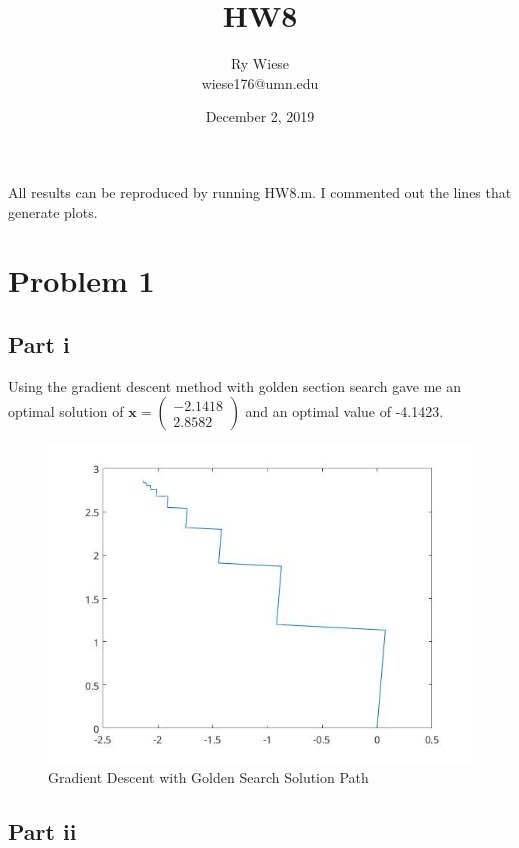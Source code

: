 \documentclass{article}
\title{HW8}
\author{Ry Wiese\\wiese176@umn.edu}
\date{December 2, 2019}
\begin{document}
\maketitle

All results can be reproduced by running HW8.m. I commented out the lines that generate plots.

\section{Problem 1}

\subsection{Part i}

Using the gradient descent method with golden section search gave me an optimal solution of $\mathbf{x} = \left( \begin{array}{cc} -2.1418\\2.8582 \end{array} \right)$ and an optimal value of -4.1423.

\begin{figure}[H] %
  \centering
  \includegraphics[angle=0,totalheight=50mm]{P1igraph.jpg}
  \caption{Gradient Descent with Golden Search Solution Path}
  \label{fig:tabl}
\end{figure}

\subsection{Part ii}
\end{document}
